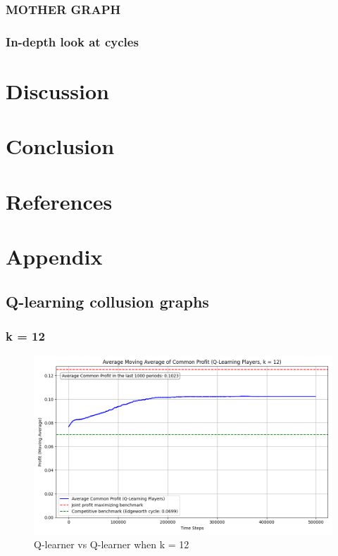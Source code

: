 \documentclass{article}
\begin{document}
\subsubsection{MOTHER GRAPH}
\subsubsection{In-depth look at cycles}
\label{In-depth look at cycles}


\section{Discussion}


\section{Conclusion}

\newpage 


\section{References}





\section{Appendix}
\subsection{Q-learning collusion graphs}

\subsubsection{k = 12}
\begin{figure}[H]
    \centering
    \includegraphics[scale = 0.45]{K=12.png}
    \caption{Q-learner vs Q-learner when k = 12}
    \label{fig: QlearnervQlearnerK=12}
\end{figure}
\end{document}

